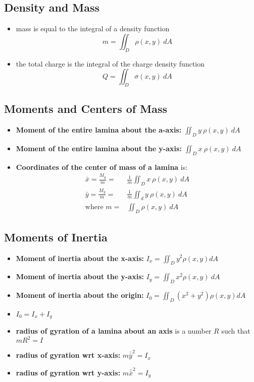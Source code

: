\documentclass{package/notes}
\begin{document}
\subsection{Density and Mass}

\begin{itemize}
	\item mass is equal to the integral of a density function $$m = \iint_D\rho(x,y)\:dA$$
	\item the total charge is the integral of the charge density function $$Q=\iint_D\sigma(x,y)\:dA$$
\end{itemize}


\subsection{Moments and Centers of Mass}

\begin{itemize}
	\item \textbf{Moment of the entire lamina about the a-axis:} $\iint_Dy\:\rho(x,y)\:dA$
	\item \textbf{Moment of the entire lamina about the y-axis:} $\iint_D x\:\rho(x,y)\:dA$
	\item \textbf{Coordinates of the center of mass of a lamina} is:
	$$
	\begin{aligned}
		\bar{x} = \frac{M_y}{m}=&\frac{1}{m}\iint_Dx\:\rho(x,y)\:dA\\
		\bar{y} = \frac{M_y}{m}=&\frac{1}{m}\iint_dy\:\rho(x,y)\:dA\\
		\text{where } m=&\iint_D\rho(x,y)\:dA
	\end{aligned}
	$$
\end{itemize}

\subsection{Moments of Inertia}

\begin{itemize}
	\item \textbf{Moment of inertia about the x-axis:} $I_x=\iint_Dy^2\rho(x,y)dA$
	\item \textbf{Moment of inertia about the y-axis:} $I_y = \iint_Dx^2\rho(x,y)\:dA$
	\item \textbf{Moment of inertia about the origin:} $I_0=\iint_D(x^2+y^2)\rho(x,y)dA$
	\item $I_0=I_x+I_y$
	\item \textbf{radius of gyration of a lamina about an axis} is a number $R$ such that $mR^2 = I$
	\item \textbf{radius of gyration wrt x-axis:} $m\bar{\bar{y}}^2=I_x$ 
	\item \textbf{radius of gyration wrt y-axis:} $m\bar{\bar{x}}^2=I_y$
\end{itemize}
\end{document}
